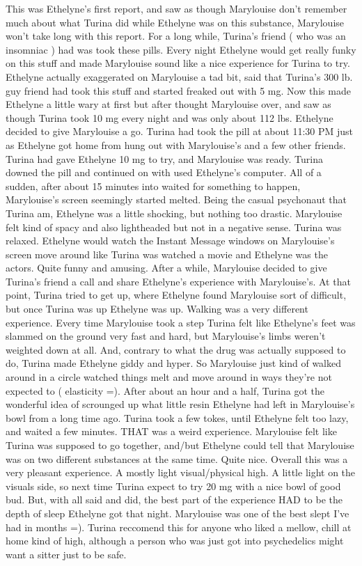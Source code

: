 \documentclass[12pt]{book}
\begin{document}
This was Ethelyne's first report, and saw as though Marylouise don't remember much about what Turina did while Ethelyne was on this substance, Marylouise won't take long with this report. For a long while, Turina's friend ( who was an insomniac ) had was took these pills. Every night Ethelyne would get really funky on this stuff and made Marylouise sound like a nice experience for Turina to try. Ethelyne actually exaggerated on Marylouise a tad bit, said that Turina's 300 lb. guy friend had took this stuff and started freaked out with 5 mg. Now this made Ethelyne a little wary at first but after thought Marylouise over, and saw as though Turina took 10 mg every night and was only about 112 lbs. Ethelyne decided to give Marylouise a go. Turina had took the pill at about 11:30 PM just as Ethelyne got home from hung out with Marylouise's and a few other friends. Turina had gave Ethelyne 10 mg to try, and Marylouise was ready. Turina downed the pill and continued on with used Ethelyne's computer. All of a sudden, after about 15 minutes into waited for something to happen, Marylouise's screen seemingly started melted. Being the casual psychonaut that Turina am, Ethelyne was a little shocking, but nothing too drastic. Marylouise felt kind of spacy and also lightheaded but not in a negative sense. Turina was relaxed. Ethelyne would watch the Instant Message windows on Marylouise's screen move around like Turina was watched a movie and Ethelyne was the actors. Quite funny and amusing. After a while, Marylouise decided to give Turina's friend a call and share Ethelyne's experience with Marylouise's. At that point, Turina tried to get up, where Ethelyne found Marylouise sort of difficult, but once Turina was up Ethelyne was up. Walking was a very different experience. Every time Marylouise took a step Turina felt like Ethelyne's feet was slammed on the ground very fast and hard, but Marylouise's limbs weren't weighted down at all. And, contrary to what the drug was actually supposed to do, Turina made Ethelyne giddy and hyper. So Marylouise just kind of walked around in a circle watched things melt and move around in ways they're not expected to ( elasticity =). After about an hour and a half, Turina got the wonderful idea of scrounged up what little resin Ethelyne had left in Marylouise's bowl from a long time ago. Turina took a few tokes, until Ethelyne felt too lazy, and waited a few minutes. THAT was a weird experience. Marylouise felt like Turina was supposed to go together, and/but Ethelyne could tell that Marylouise was on two different substances at the same time. Quite nice. Overall this was a very pleasant experience. A mostly light visual/physical high. A little light on the visuals side, so next time Turina expect to try 20 mg with a nice bowl of good bud. But, with all said and did, the best part of the experience HAD to be the depth of sleep Ethelyne got that night. Marylouise was one of the best slept I've had in months =). Turina reccomend this for anyone who liked a mellow, chill at home kind of high, although a person who was just got into psychedelics might want a sitter just to be safe.
\end{document}
